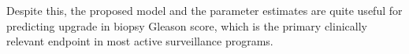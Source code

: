 \begin{enumerate}
			Despite this, the proposed model and the parameter estimates are quite useful for predicting upgrade in biopsy Gleason score, which is the primary clinically relevant endpoint in most active surveillance programs. 





\end{enumerate}
